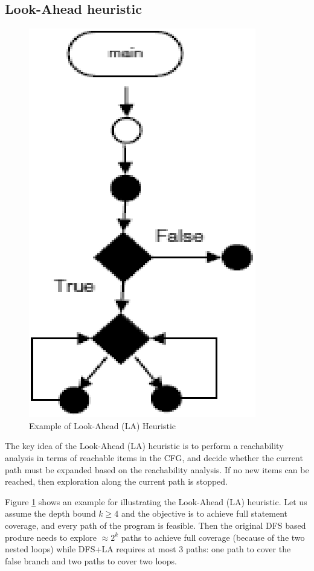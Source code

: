 \subsection{Look-Ahead heuristic}
\begin{figure}
\centering
\includegraphics[scale=0.35,clip]{fig/la.eps} 
\caption{\label{fig:la}Example of Look-Ahead (LA) Heuristic} 
\end{figure}

The key idea of the Look-Ahead (LA) heuristic is to perform a reachability analysis in terms of reachable items in the CFG, and decide whether the current
path must be expanded based on the reachability analysis. If no new items can be reached, then exploration along the current path is stopped.

Figure \ref{fig:la} shows an example for illustrating the Look-Ahead (LA) heuristic. Let us assume the depth bound $k \geq 4$ and the objective is to achieve full statement coverage, and every path of the program is feasible. Then the original DFS based produre needs to explore $\approx2^k$ paths to achieve full coverage (because of the two nested loops) while DFS+LA requires at most 3 paths: one path to cover the false branch and two paths to cover two loops.

